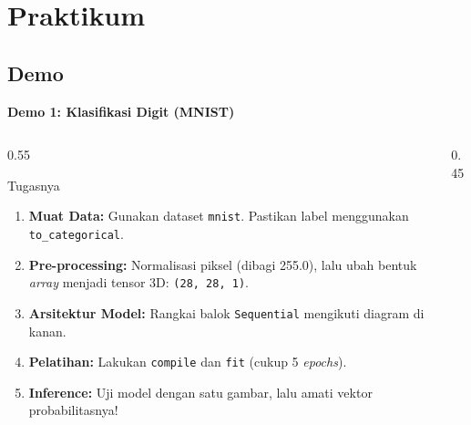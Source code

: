 \documentclass{beamer}
\begin{document}
\section{Praktikum}
\subsection{Demo}
\begin{frame}{\textbf{Demo 1: Klasifikasi Digit (MNIST)}}
    
    \begin{columns}[c] %
        
        \begin{column}{0.55\textwidth}
            \begin{alertblock}{Tugasnya}
                \small 
                \begin{enumerate}
                    \setlength{\itemsep}{0.1cm} 
                    \item \textbf{Muat Data:} Gunakan dataset \texttt{mnist}. Pastikan label menggunakan \texttt{to\_categorical}.
                    \item \textbf{Pre-processing:} Normalisasi piksel (dibagi 255.0), lalu ubah bentuk \textit{array} menjadi tensor 3D: \texttt{(28, 28, 1)}.
                    \item \textbf{Arsitektur Model:} Rangkai balok \texttt{Sequential} mengikuti diagram di kanan.
                    \item \textbf{Pelatihan:} Lakukan \texttt{compile} dan \texttt{fit} (cukup 5 \textit{epochs}).
                    \item \textbf{Inference:} Uji model dengan satu gambar, lalu amati vektor probabilitasnya!
                \end{enumerate}
            \end{alertblock}
        \end{column}
        
        \begin{column}{0.45\textwidth}
            \centering
\end{column}
\end{columns}
\end{frame}
\end{document}
